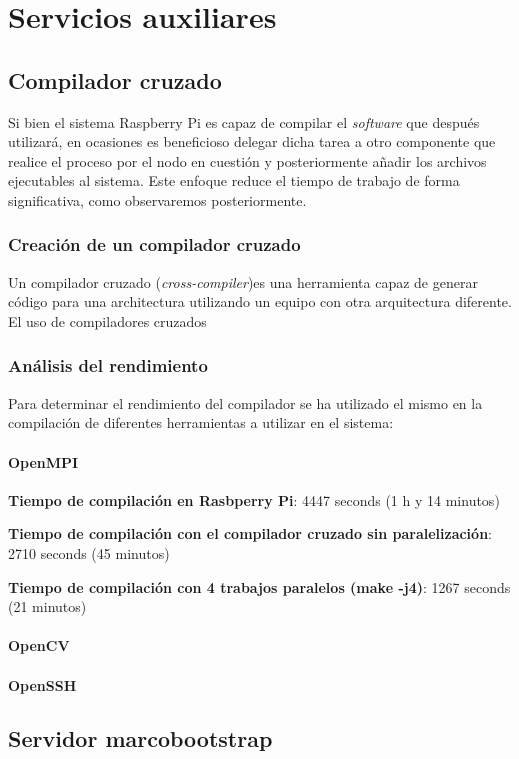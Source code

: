 \chapter{Servicios auxiliares}


\section{Compilador cruzado}

Si bien el sistema Raspberry Pi es capaz de compilar el \textit{software} que después utilizará, en ocasiones es beneficioso delegar dicha tarea a otro componente que realice el proceso por el nodo en cuestión y posteriormente añadir los archivos ejecutables al sistema. Este enfoque reduce el tiempo de trabajo de forma significativa, como observaremos posteriormente.%

\subsection{Creación de un compilador cruzado}

Un compilador cruzado (\textit{cross-compiler})es una herramienta capaz de generar código para una architectura utilizando un equipo con otra arquitectura diferente.%
El uso de compiladores cruzados 

\subsection{Análisis del rendimiento}

Para determinar el rendimiento del compilador se ha utilizado el mismo en la compilación de diferentes herramientas a utilizar en el sistema:

\subsubsection{OpenMPI}

\textbf{Tiempo de compilación en Rasbperry Pi}: 4447 seconds (1 h y 14 minutos)

\textbf{Tiempo de compilación con el compilador cruzado sin paralelización}: 2710 seconds (45 minutos)

\textbf{Tiempo de compilación con 4 trabajos paralelos (make -j4)}: 1267 seconds (21 minutos)

\subsubsection{OpenCV}

\subsubsection{OpenSSH}

\section{Servidor marcobootstrap}